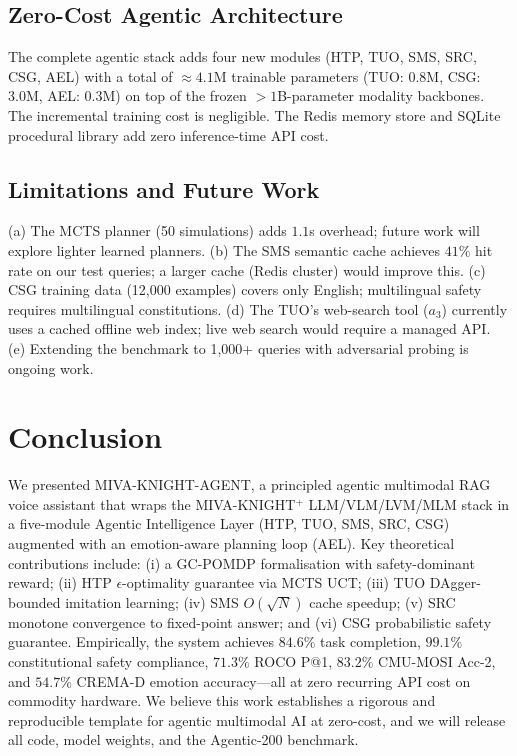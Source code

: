 \documentclass[10pt,conference]{IEEEtran}
\theoremstyle{ieeethm}
\theoremstyle{ieeedef}
\theoremstyle{ieeeremark}
\begin{document}
\subsection{Zero-Cost Agentic Architecture}

The complete agentic stack adds four new modules (HTP, TUO, SMS, SRC, CSG, AEL) with a total of $\approx 4.1$M trainable parameters (TUO: 0.8M, CSG: 3.0M, AEL: 0.3M) on top of the frozen $>1$B-parameter modality backbones. The incremental training cost is negligible. The Redis memory store and SQLite procedural library add zero inference-time API cost.

\subsection{Limitations and Future Work}

(a) The MCTS planner (50 simulations) adds $1.1$s overhead; future work will explore lighter learned planners. (b) The SMS semantic cache achieves $41\%$ hit rate on our test queries; a larger cache (Redis cluster) would improve this. (c) CSG training data (12,000 examples) covers only English; multilingual safety requires multilingual constitutions. (d) The TUO's web-search tool ($a_3$) currently uses a cached offline web index; live web search would require a managed API. (e) Extending the benchmark to 1,000+ queries with adversarial probing is ongoing work.

\section{Conclusion}
\label{sec:conclusion}

We presented \textsc{MIVA-KNIGHT-AGENT}, a principled agentic multimodal RAG voice assistant that wraps the \textsc{MIVA-KNIGHT}$^+$ LLM/VLM/LVM/MLM stack in a five-module Agentic Intelligence Layer (HTP, TUO, SMS, SRC, CSG) augmented with an emotion-aware planning loop (AEL). Key theoretical contributions include: (i) a GC-POMDP formalisation with safety-dominant reward; (ii) HTP $\epsilon$-optimality guarantee via MCTS UCT; (iii) TUO DAgger-bounded imitation learning; (iv) SMS $O(\sqrt{N})$ cache speedup; (v) SRC monotone convergence to fixed-point answer; and (vi) CSG probabilistic safety guarantee. Empirically, the system achieves $84.6\%$ task completion, $99.1\%$ constitutional safety compliance, $71.3\%$ ROCO P@1, $83.2\%$ CMU-MOSI Acc-2, and $54.7\%$ CREMA-D emotion accuracy---all at zero recurring API cost on commodity hardware. We believe this work establishes a rigorous and reproducible template for agentic multimodal AI at zero-cost, and we will release all code, model weights, and the Agentic-200 benchmark.
\end{document}
